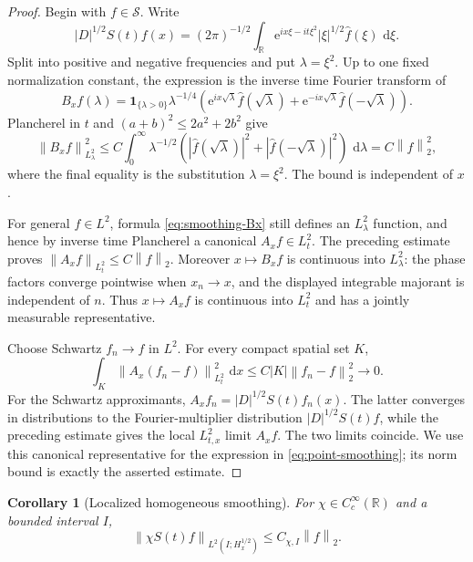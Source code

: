 \documentclass[11pt,oneside]{book}
\newtheorem{corollary}[theorem]{Corollary}
\theoremstyle{definition}
\theoremstyle{remark}
\newcommand{\R}{\mathbb R}
\newcommand{\Ssch}{\mathcal S}
\newcommand{\1}{\mathbf 1}
\newcommand{\dd}{\,\mathrm d}
\newcommand{\norm}[1]{\left\lVert #1\right\rVert}
\newcommand{\e}{\mathrm e}
\begin{document}
\begin{proof}
Begin with $f\in\Ssch$.  Write
\[
 |D|^{1/2}S(t)f(x)
 =(2\pi)^{-1/2}\int_\R
    \e^{ix\xi-it\xi^2}|\xi|^{1/2}\widehat f(\xi)\,\dd\xi.
\]
Split into positive and negative frequencies and put $\lambda=\xi^2$.  Up to
one fixed normalization constant, the expression is the inverse time Fourier
transform of
\begin{equation}
 B_xf(\lambda)=\1_{\{\lambda>0\}}\lambda^{-1/4}
 \left(\e^{ix\sqrt\lambda}\widehat f(\sqrt\lambda)
      +\e^{-ix\sqrt\lambda}\widehat f(-\sqrt\lambda)\right).
 \label{eq:smoothing-Bx}
\end{equation}
Plancherel in $t$ and $(a+b)^2\le2a^2+2b^2$ give
\[
 \norm{B_xf}_{L^2_\lambda}^2
 \le C\int_0^\infty \lambda^{-1/2}
 \left(|\widehat f(\sqrt\lambda)|^2
      +|\widehat f(-\sqrt\lambda)|^2\right)\,\dd\lambda
 =C\norm f_2^2,
\]
where the final equality is the substitution $\lambda=\xi^2$.  The bound is
independent of $x$.

For general $f\in L^2$, formula \eqref{eq:smoothing-Bx} still defines an
$L^2_\lambda$ function, and hence by inverse time Plancherel a canonical
$A_xf\in L^2_t$.  The preceding estimate proves
$\norm{A_xf}_{L^2_t}\le C\norm f_2$.  Moreover
$x\mapsto B_xf$ is continuous into $L^2_\lambda$: the phase factors converge
pointwise when $x_n\to x$, and the displayed integrable majorant is
independent of $n$.  Thus $x\mapsto A_xf$ is continuous into $L^2_t$ and has
a jointly measurable representative.

Choose Schwartz $f_n\to f$ in $L^2$.  For every compact spatial set $K$,
\[
 \int_K\norm{A_x(f_n-f)}_{L^2_t}^2\,\dd x
 \le C|K|\norm{f_n-f}_2^2\longrightarrow0.
\]
For the Schwartz approximants, $A_xf_n=|D|^{1/2}S(t)f_n(x)$.  The latter
converges in distributions to the Fourier-multiplier distribution
$|D|^{1/2}S(t)f$, while the preceding estimate gives the local
$L^2_{t,x}$ limit $A_xf$.  The two limits coincide.  We use this canonical
representative for the expression in \eqref{eq:point-smoothing}; its norm
bound is exactly the asserted estimate.
\end{proof}

\begin{corollary}[Localized homogeneous smoothing]\label{cor:hom-smoothing}
For $\chi\in C_c^\infty(\R)$ and a bounded interval $I$,
\begin{equation}
 \norm{\chi S(t)f}_{L^2(I;H^{1/2}_x)}
 \le C_{\chi,I}\norm f_2.                          \label{eq:hom-local-smoothing}
\end{equation}
\end{corollary}
\end{document}
